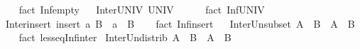 \begin{isabellebody}
%
\isadelimproof
\ \ %
\endisadelimproof
%
\isatagproof
{}\isamarkupfalse%
\ {\isacharparenleft}{\kern0pt}fact\ Inf{\isacharunderscore}{\kern0pt}empty{\isacharparenright}{\kern0pt}%
\endisatagproof
{\isafoldproof}%
%
\isadelimproof
%
\endisadelimproof
\ \isanewline
\isanewline
{}\isamarkupfalse%
\ Inter{\isacharunderscore}{\kern0pt}UNIV{\isacharcolon}{\kern0pt}\ {\isachardoublequoteopen}{\isasymInter}UNIV\ {\isacharequal}{\kern0pt}\ {\isacharbraceleft}{\kern0pt}{\isacharbraceright}{\kern0pt}{\isachardoublequoteclose}\isanewline
%
\isadelimproof
\ \ %
\endisadelimproof
%
\isatagproof
{}\isamarkupfalse%
\ {\isacharparenleft}{\kern0pt}fact\ Inf{\isacharunderscore}{\kern0pt}UNIV{\isacharparenright}{\kern0pt}%
\endisatagproof
{\isafoldproof}%
%
\isadelimproof
%
\endisadelimproof
\ \isanewline
\isanewline
{}\isamarkupfalse%
\ Inter{\isacharunderscore}{\kern0pt}insert{\isacharcolon}{\kern0pt}\ {\isachardoublequoteopen}{\isasymInter}{\isacharparenleft}{\kern0pt}insert\ a\ B{\isacharparenright}{\kern0pt}\ {\isacharequal}{\kern0pt}\ a\ {\isasyminter}\ {\isasymInter}B{\isachardoublequoteclose}\isanewline
%
\isadelimproof
\ \ %
\endisadelimproof
%
\isatagproof
{}\isamarkupfalse%
\ {\isacharparenleft}{\kern0pt}fact\ Inf{\isacharunderscore}{\kern0pt}insert{\isacharparenright}{\kern0pt}%
\endisatagproof
{\isafoldproof}%
%
\isadelimproof
%
\endisadelimproof
\ \isanewline
\isanewline
{}\isamarkupfalse%
\ Inter{\isacharunderscore}{\kern0pt}Un{\isacharunderscore}{\kern0pt}subset{\isacharcolon}{\kern0pt}\ {\isachardoublequoteopen}{\isasymInter}A\ {\isasymunion}\ {\isasymInter}B\ {\isasymsubseteq}\ {\isasymInter}{\isacharparenleft}{\kern0pt}A\ {\isasyminter}\ B{\isacharparenright}{\kern0pt}{\isachardoublequoteclose}\isanewline
%
\isadelimproof
\ \ %
\endisadelimproof
%
\isatagproof
{}\isamarkupfalse%
\ {\isacharparenleft}{\kern0pt}fact\ less{\isacharunderscore}{\kern0pt}eq{\isacharunderscore}{\kern0pt}Inf{\isacharunderscore}{\kern0pt}inter{\isacharparenright}{\kern0pt}%
\endisatagproof
{\isafoldproof}%
%
\isadelimproof
\isanewline
%
\endisadelimproof
\isanewline
{}\isamarkupfalse%
\ Inter{\isacharunderscore}{\kern0pt}Un{\isacharunderscore}{\kern0pt}distrib{\isacharcolon}{\kern0pt}\ {\isachardoublequoteopen}{\isasymInter}{\isacharparenleft}{\kern0pt}A\ {\isasymunion}\ B{\isacharparenright}{\kern0pt}\ {\isacharequal}{\kern0pt}\ {\isasymInter}A\ {\isasyminter}\ {\isasymInter}B{\isachardoublequoteclose}\isanewline
%
\isadelimproof
\ \ %
\endisadelimproof
%
\isatagproof

\end{isabellebody}
